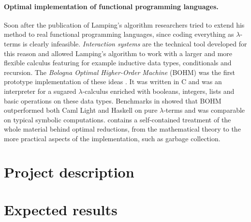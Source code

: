 \documentclass[english]{scrartcl}
\begin{document}
\paragraph{Optimal implementation of functional programming languages.}Soon after the publication of Lamping's algorithm researchers tried to extend his method to real functional programming languages, since coding everything as $\lambda$-terms is clearly infeasible. \emph{Interaction systems} \cite{asperti_interaction_1994, asperti_interaction_1996} are the technical tool developed for this reason and allowed Lamping's algorithm to work with a larger and more flexible calculus featuring for example inductive data types, conditionals and recursion. The \emph{Bologna Optimal Higher-Order Machine} (BOHM) was the first prototype implementation of these ideas \cite{asperti_bologna_1996}. It was written in C and was an interpreter for a sugared $\lambda$-calculus enriched with booleans, integers, lists and basic operations on these data types. Benchmarks in \cite{asperti_optimal_1998} showed that BOHM outperformed both Caml Light and Haskell on pure $\lambda$-terms and was comparable on typical symbolic computations. \cite{asperti_optimal_1998} contains a self-contained treatment of the whole material behind optimal reductions, from the mathematical theory to the more practical aspects of the implementation, such as garbage collection.
\section{Project description}
\section{Expected results}


\end{document}
